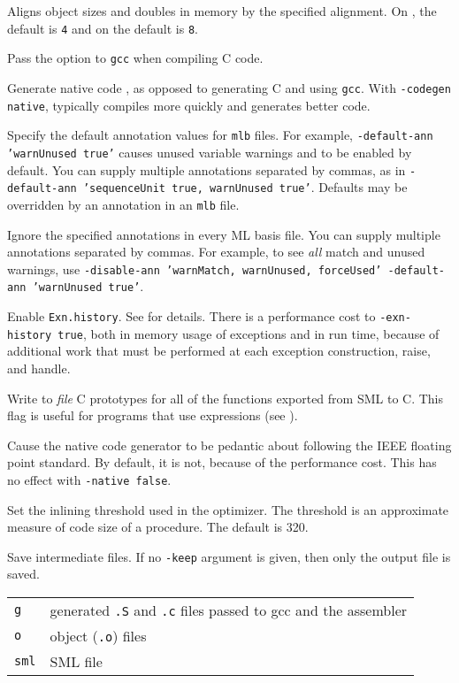 \begin{description}

Aligns object sizes and doubles in memory by the specified alignment.
On {\intel}, the default is {\tt 4} and on {\sparc} the default is
{\tt 8}.

Pass the option to {\tt gcc} when compiling C code.

Generate native code , as opposed to generating C and using {\tt gcc}.
With {\tt -codegen native}, {\mlton} typically compiles more quickly and
generates better code.

Specify the default annotation values for {\tt mlb} files.  For
example, {\tt -default-ann 'warnUnused true'} causes unused variable
warnings and to be enabled by default.  You can supply multiple
annotations separated by commas, as in {\tt -default-ann 'sequenceUnit
true, warnUnused true'}.  Defaults may be overridden by an annotation
in an {\tt mlb} file.

Ignore the specified annotations in every ML basis file.  You can
supply multiple annotations separated by commas.  For example, to see
{\em all} match and unused warnings, use {\tt -disable-ann 'warnMatch,
warnUnused, forceUsed' -default-ann 'warnUnused true'}.

Enable {\tt Exn.history}.  See  for details.  There is a
performance cost to {\tt -exn-history true}, both in memory usage of
exceptions and in run time, because of additional work that must be
performed at each exception construction, raise, and handle.

Write to {\it file} C prototypes for all of the functions exported
from SML to C.  This flag is useful for programs that use {\export}
expressions (see ).

Cause the native code generator to be pedantic about following the
IEEE floating point standard.  By default, it is not, because of the
performance cost.  This has no effect with {\tt -native false}.

Set the inlining threshold used in the optimizer.  The threshold is an
approximate measure of code size of a procedure.  The default is 320.

Save intermediate files.  If no {\tt -keep} argument is given, then
only the output file is saved.\\
\hspace*{0.5in}
\begin{tabular}{l|l}
\hline
{\tt g} & generated {\tt .S} and {\tt .c} files passed to gcc and the assembler\\
{\tt o} & object ({\tt .o}) files\\
{\tt sml} & SML file\\
\end{tabular}


\end{description}
